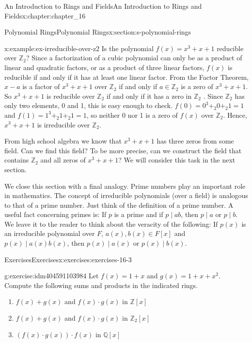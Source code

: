 \documentclass[twoside,10pt,]{book}
\numberwithin{equation}{section}
\begin{document}
\begin{chapterptx}{An Introduction to Rings and Fields}{}{An Introduction to Rings and Fields}{}{}{x:chapter:chapter_16}
\begin{sectionptx}{Polynomial Rings}{}{Polynomial Rings}{}{}{x:section:s-polynomial-rings}
\begin{example}{}{x:example:ex-irreducible-over-z2}
Is the polynomial \(f(x) = x^3 + x + 1\) reducible over \(\mathbb{Z}_2\)? Since a factorization of a cubic polynomial can only be as a product of linear and quadratic factors, or as a product of three linear factors, \(f(x)\) is reducible if and only if it has at least one linear  factor. From the Factor Theorem,  \(x - a\) is a factor of \(x^3 + x + 1\) over \(\mathbb{Z}_2\) if and only if \(a \in \mathbb{Z}_2\) is a zero of \(x^3 + x + 1\). So \(x^3 + x + 1\) is reducible over \(\mathbb{Z}_2\) if and only if it has a zero in \(\mathbb{Z}_2\) . Since \(\mathbb{Z}_2\) has only two elements, 0 and 1, this is easy enough to check.  \(f(0) = 0^3 +_2 0+_2 1= 1\)   and \(f(1) =1^3 +_2 1 +_2 1 = 1\), so neither 0 nor 1 is a zero of \(f(x)\) over \(\mathbb{Z}_2\). Hence, \(x^3 + x + 1\) is irreducible over \(\mathbb{Z}_2\).%
\end{example}
From high school algebra we know that \(x^3 + x + 1\) has three zeros from some field. Can we find this field? To be more precise, can we construct the field that contains \(\mathbb{Z}_2\) and all zeros of \(x^3 + x + 1\)? We will consider this task in the next section.%
\par
We close this section with a final analogy. Prime numbers play an important role in mathematics. The concept of irreducible polynomials (over a field) is analogous to that of a prime number. Just think of the definition of a prime number. A useful fact concerning primes is: If \(p\) is a prime and if \(p \mid a b\), then \(p  \mid  a\) or \(p  \mid  b\). We leave it to the reader to think about the veracity of the following: If \(p(x)\) is an irreducible polynomial over \(F\), \(a(x), b(x) \in F[x]\) and \(p(x) \mid a(x) b(x)\), then \(p(x) \mid a(x)\) or \(p(x) \mid b(x)\).%
%
%
\typeout{************************************************}
\typeout{************************************************}
%
\begin{exercises-subsection}{Exercises}{}{Exercises}{}{}{x:exercises:exercises-16-3}
\begin{divisionexercise}{1}{}{}{g:exercise:idm404591103984}%
Let \(f(x) = 1 + x\) and \(g(x) = 1 + x + x^2\). Compute the following sums and products in the indicated rings.%
\begin{enumerate}[label=(\alph*)]
\item{}\(f(x) + g(x)\) and \(f(x) \cdot  g(x)\) in \(\mathbb{Z}[x]\)%
\item{}\(f(x) + g(x)\) and \(f(x) \cdot  g(x)\) in \(\mathbb{Z}_2[x]\)%
\item{}\((f(x)\cdot  g(x))\cdot f(x)\)  in \(\mathbb{Q}[x]\)%

\end{enumerate}
\end{divisionexercise}
\end{exercises-subsection}
\end{sectionptx}
\end{chapterptx}
\end{document}
